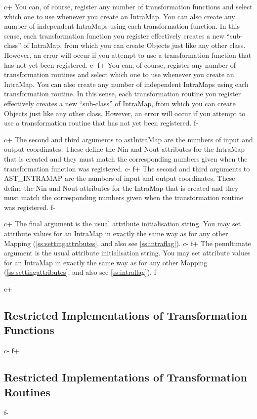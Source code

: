 \documentclass[twoside,11pt]{article}
\newcommand{\secref}[1]{\S\ref{#1}}
\renewcommand{\secref}[1]{\ref{#1}}
\begin{document}
c+
You can, of course, register any number of transformation functions
and select which one to use whenever you create an IntraMap. You can
also create any number of independent IntraMaps using each
transformation function. In this sense, each transformation function
you register effectively creates a new ``sub-class'' of IntraMap, from
which you can create Objects just like any other class. However, an
error will occur if you attempt to use a transformation function that
has not yet been registered.
c-
f+
You can, of course, register any number of transformation routines and
select which one to use whenever you create an IntraMap. You can also
create any number of independent IntraMaps using each transformation
routine. In this sense, each transformation routine you register
effectively creates a new ``sub-class'' of IntraMap, from which you
can create Objects just like any other class. However, an error will
occur if you attempt to use a transformation routine that has not yet
been registered.
f-

c+
The second and third arguments to astIntraMap are the numbers of input
and output coordinates. These define the Nin and Nout attributes for
the IntraMap that is created and they must match the corresponding
numbers given when the transformation function was registered.
c-
f+
The second and third arguments to AST\_INTRAMAP are the numbers of
input and output coordinates. These define the Nin and Nout attributes
for the IntraMap that is created and they must match the corresponding
numbers given when the transformation routine was registered.
f-

c+
The final argument is the usual attribute initialisation string. You
may set attribute values for an IntraMap in exactly the same way as
for any other Mapping (\secref{ss:settingattributes}, and also see
\secref{ss:intraflag}).
c-
f+
The penultimate argument is the usual attribute initialisation
string. You may set attribute values for an IntraMap in exactly the
same way as for any other Mapping (\secref{ss:settingattributes}, and
also see \secref{ss:intraflag}).
f-

c+
\subsection{\label{ss:restrictedintramaps}Restricted Implementations of Transformation Functions}
c-
f+
\subsection{\label{ss:restrictedintramaps}Restricted Implementations of Transformation Routines}
f-
\end{document}
